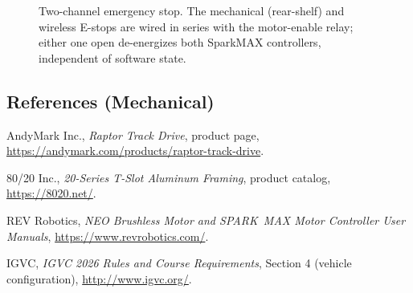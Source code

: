 \documentclass[11pt, letterpaper]{article}
\begin{document}
\begin{figure}[H]
    \centering
    
    \caption{Two-channel emergency stop. The mechanical (rear-shelf) and wireless E-stops
    are wired in series with the motor-enable relay; either one open de-energizes both
    SparkMAX controllers, independent of software state.}
    \label{fig:safety_block}
\end{figure}

\subsection*{References (Mechanical)}
\small
\sloppy
\begin{enumerate}[label={[\arabic*]}]
    \item AndyMark Inc., \textit{Raptor Track Drive}, product page,
    \url{https://andymark.com/products/raptor-track-drive}.
    \item 80/20 Inc., \textit{20-Series T-Slot Aluminum Framing}, product catalog,
    \url{https://8020.net/}.
    \item REV Robotics, \textit{NEO Brushless Motor and SPARK~MAX Motor Controller User
    Manuals}, \url{https://www.revrobotics.com/}.
    \item IGVC, \textit{IGVC 2026 Rules and Course Requirements}, Section 4 (vehicle
    configuration), \url{http://www.igvc.org/}.
\end{enumerate}
\end{document}
